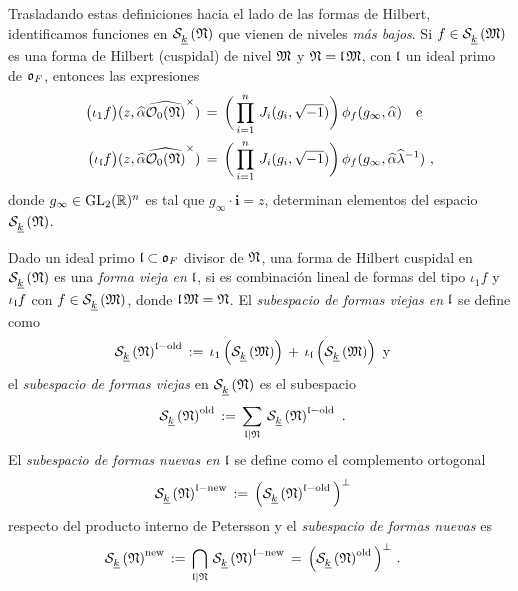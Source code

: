 Trasladando estas definiciones hacia el lado de las formas de Hilbert,
identificamos funciones en $\spitzH{k}{\frak{N}}$ que vienen de niveles
\emph{m\'{a}s bajos}. Si $f\in\spitzH{k}{\frak{M}}$ es una forma de Hilbert
(cuspidal) de nivel $\frak{M}$ y $\frak{N}=\frak{l}\,\frak{M}$, con
$\frak{l}$ un ideal primo de $\oka{F}$, entonces las expresiones
\begin{align*}
	\big(\iota_{1}f\big) (z,\hhat{\alpha}\Idfin{\cal{O}_{0}(\frak{N})})
		& \,=\, \bigg(\prod_{i=1}^{n}\,J_{i}(g_{i},\sqrt{-1})\bigg)\,
			\phi_{f}(g_{\infty},\hhat{\alpha}) \quad\text{e} \\
	\big(\iota_{\frak{l}}f\big) (z,
		\hhat{\alpha}\Idfin{\cal{O}_{0}(\frak{N})})
		& \,=\, \bigg(\prod_{i=1}^{n}\,J_{i}(g_{i},\sqrt{-1})\bigg)\,
			\phi_{f}(g_{\infty},\hhat{\alpha}\hhat{\lambda}^{-1})
	\text{ ,}
\end{align*}
%
donde $g_{\infty}\in\GL_{2}(\bb{R})^{n}$ es tal que
$g_{\infty}\cdot\mathbf{i}=z$, determinan elementos del espacio
$\spitzH{k}{\frak{N}}$.

\begin{defFormasViejasFormasNuevas}\label{def:formasviejasformasnuevas}
	Dado un ideal primo $\frak{l}\subset\oka{F}$ divisor de $\frak{N}$,
	una forma de Hilbert cuspidal en $\spitzH{k}{\frak{N}}$ es una
	\emph{forma vieja en $\frak{l}$}, si es combinaci\'{o}n lineal de
	formas del tipo $\iota_{1}f$ y $\iota_{\frak{l}}f$ con
	$f\in\spitzH{k}{\frak{M}}$, donde $\frak{l}\,\frak{M}=\frak{N}$.
	El \emph{subespacio de formas viejas en $\frak{l}$} se define como
	\begin{align*}
		\spitzH{k}{\frak{N}}^{\frak{l}-\oude} & \,:=\,
			\iota_{1}\left(\spitzH{k}{\frak{M}}\right)\,+\,
			\iota_{\frak{l}}\left(\spitzH{k}{\frak{M}}\right)
		\text{ y}
	\end{align*}
	el \emph{subespacio de formas viejas} en $\spitzH{k}{\frak{N}}$ es
	el subespacio
	\begin{align*}
		\spitzH{k}{\frak{N}}^{\oude} & \,:=\,
			\sum_{\frak{l}\mid\frak{N}}\,
			\spitzH{k}{\frak{N}}^{\frak{l}-\oude}
		\text{ .}
	\end{align*}
	El \emph{subespacio de formas nuevas en $\frak{l}$} se define
	como el complemento ortogonal
	\begin{align*}
		\spitzH{k}{\frak{N}}^{\frak{l}-\neue} &  \,:=\,
			\Big(\spitzH{k}{\frak{N}}^{\frak{l}-\oude}\Big)^{\perp}
	\end{align*}
	respecto del producto interno de Petersson y el
	\emph{subespacio de formas nuevas} es
	\begin{align*}
		\spitzH{k}{\frak{N}}^{\neue} & \,:=\,
			\bigcap_{\frak{l}\mid\frak{N}}\,
			\spitzH{k}{\frak{N}}^{\frak{l}-\neue}
			\,=\,\Big(\spitzH{k}{\frak{N}}^{\oude}\Big)^{\perp}
		\text{ .}
	\end{align*}
\end{defFormasViejasFormasNuevas}

